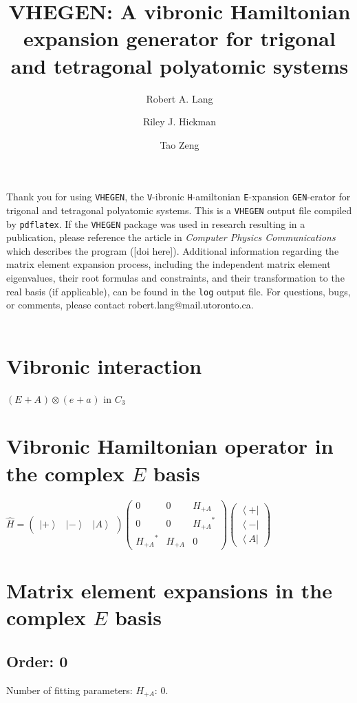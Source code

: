 \documentclass[fleqn]{article}
\title{VHEGEN: A vibronic Hamiltonian expansion generator for trigonal and tetragonal polyatomic systems}
\author{Robert A. Lang \and Riley J. Hickman \and Tao Zeng}
\date{}
\begin{document}
\maketitle
Thank you for using \texttt{VHEGEN}, the \texttt{V}-ibronic \texttt{H}-amiltonian \texttt{E}-xpansion \texttt{GEN}-erator for trigonal and tetragonal polyatomic systems. This is a \texttt{VHEGEN} output file compiled by \texttt{pdflatex}. If the \texttt{VHEGEN} package was used in research resulting in a publication, please reference the article in \textit{Computer Physics Communications} which describes the program ([doi here]). Additional information regarding the matrix element expansion process, including the independent matrix element eigenvalues, their root formulas and constraints, and their transformation to the real basis (if applicable), can be found in the \texttt{log} output file. For questions, bugs, or comments, please contact robert.lang@mail.utoronto.ca.\\\\
\tableofcontents
\newpage
\section{Vibronic interaction}
$(E_{}+A_{}) \otimes (e_{}+a_{})$ in $C_{3}$
\section{Vibronic Hamiltonian operator in the complex $E$ basis}
$\hat{H}=\left(\begin{matrix}{\left|+\right\rangle } & {\left|-\right\rangle } & {\left|A\right\rangle }\end{matrix}\right) \left(\begin{matrix}0 & 0 & H_{+A}\\0 & 0 & {H_{+A}}^*\\{H_{+A}}^* & H_{+A} & 0\end{matrix}\right) \left(\begin{matrix}{\left\langle +\right|}\\{\left\langle -\right|}\\{\left\langle A\right|}\end{matrix}\right)$
\section{Matrix element expansions in the complex $E$ basis}
\subsection{Order: 0}
Number of fitting parameters: $H_{+A}$: $0$.
\end{document}
